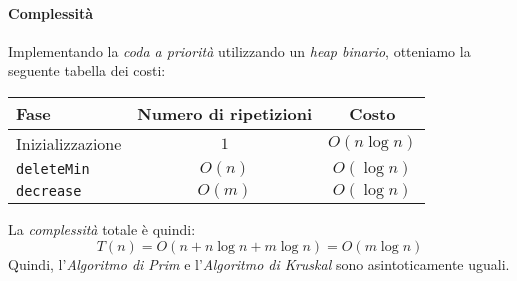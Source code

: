 \paragraph{Complessità}
Implementando la \emph{coda a priorità} utilizzando un \emph{heap binario},
otteniamo la seguente tabella dei costi:

\begin{table}[h!]
    \centering
    \renewcommand{\arraystretch}{1.2}
    \begin{tabular}{|l|c|c|}
        \hline
        \textbf{Fase} & \textbf{Numero di ripetizioni} & \textbf{Costo}\\
        \hline
        Inizializzazione & $1$ & $O(n\log n)$\\
        \hline
        \texttt{deleteMin} & $O(n)$ & $O(\log n)$\\
        \hline
        \texttt{decrease} & $O(m)$ & $O(\log n)$\\
        \hline
    \end{tabular}
\end{table}\noindent
La \emph{complessità} totale è quindi:
\[T(n)=O(n+n\log n+m\log n)=O(m\log n)\]
Quindi, l'\emph{Algoritmo di Prim} e l'\emph{Algoritmo di Kruskal} sono
asintoticamente uguali.